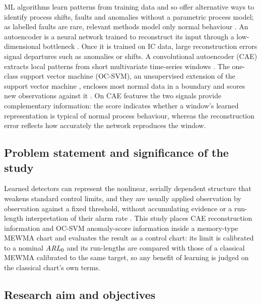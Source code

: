 ML algorithms learn patterns from training data and so offer alternative ways to identify process shifts, faults and anomalies without a parametric process model; as labelled faults are rare, relevant methods model only normal behaviour
\citep{pimentel_review_2014}. An autoencoder is a neural network trained to reconstruct its input
through a low-dimensional bottleneck \citep{hinton_reducing_2006}. Once it is trained on IC data, large reconstruction errors signal departures such as anomalies or shifts. A convolutional autoencoder (CAE) extracts local patterns from short multivariate time-series windows
\citep{lecun_gradient-based_1998,honkela_stacked_2011}. The one-class support vector machine
(OC-SVM), an unsupervised extension of the support vector machine \citep{cortes_support-vector_1995},
encloses most normal data in a boundary and scores new observations against it \citep{scholkopf_estimating_2001}. On CAE features the two signals provide complementary information: the
score indicates whether a window's learned representation is typical of normal process behaviour, whereas the reconstruction error reflects how accurately the network reproduces the window.

\subsection{Problem statement and significance of the study}

Learned detectors can represent the nonlinear, serially dependent structure that weakens standard
control limits, and they are usually applied observation by observation against a
fixed threshold, without accumulating evidence or a run-length interpretation of their alarm rate
\citep{mabu_disaster_2019,biegel_deep_2022,guzman_sidewalk_2026}. This study places CAE
reconstruction information and OC-SVM anomaly-score information inside a memory-type MEWMA chart
and evaluates the result as a control chart: its limit is calibrated to a nominal $\mathit{ARL}_0$ and its run-lengths are compared with those of a classical MEWMA calibrated to the same target, so any
benefit of learning is judged on the classical chart's own terms.

\subsection{Research aim and objectives}

